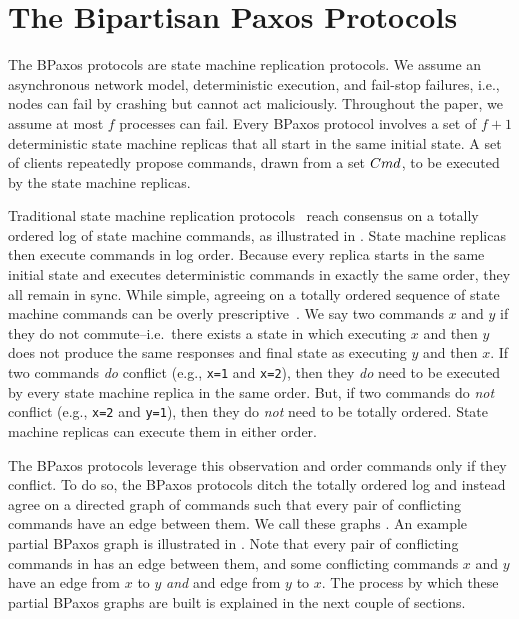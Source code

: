 \section{The Bipartisan Paxos Protocols}
The BPaxos protocols are state machine replication protocols. We assume an
asynchronous network model, deterministic execution, and fail-stop
failures, i.e., nodes can fail by crashing but cannot act maliciously. Throughout the paper, we
assume at most $f$ processes can fail. Every BPaxos protocol involves a set of
$f + 1$ deterministic state machine replicas that all start in the same initial
state. A set of clients repeatedly propose commands, drawn from a
set $Cmd$, to be executed by the state machine replicas.



Traditional state machine replication protocols~\cite{liskov2012viewstamped,
lamport1998part} reach consensus on a totally ordered log of state machine
commands, as illustrated in . State machine replicas then
execute commands in log order. Because every replica starts in the same initial
state and executes deterministic commands in exactly the same order,
they all remain in sync.
%
While simple, agreeing on a totally ordered sequence of state machine commands
can be overly prescriptive~\cite{lamport2005generalized, moraru2013there}. We
say two commands $x$ and $y$  if they do not commute--i.e.\
there exists a state in which executing $x$ and then $y$ does not produce the
same responses and final state as executing $y$ and then $x$. If two commands
\emph{do} conflict (e.g., \texttt{x=1} and \texttt{x=2}), then they \emph{do}
need to be executed by every state machine replica in the same order.  But, if
two commands do \emph{not} conflict (e.g., \texttt{x=2} and \texttt{y=1}), then
they do \emph{not} need to be totally ordered. State machine replicas can
execute them in either order.

The BPaxos protocols leverage this observation and order commands only if
they conflict. To do so, the BPaxos protocols ditch the totally ordered log and
instead agree on a directed graph of commands such that every pair of
conflicting commands have an edge between them. We call these graphs
\defword{partial BPaxos graphs}. An example partial BPaxos graph is illustrated
in . Note that every pair of conflicting commands in
\figref{BPaxosSMR} has an edge between them, and some conflicting commands $x$
and $y$ have an edge from $x$ to $y$ \emph{and} and edge from $y$ to $x$. The
process by which these partial BPaxos graphs are built is explained in the next
couple of sections.

